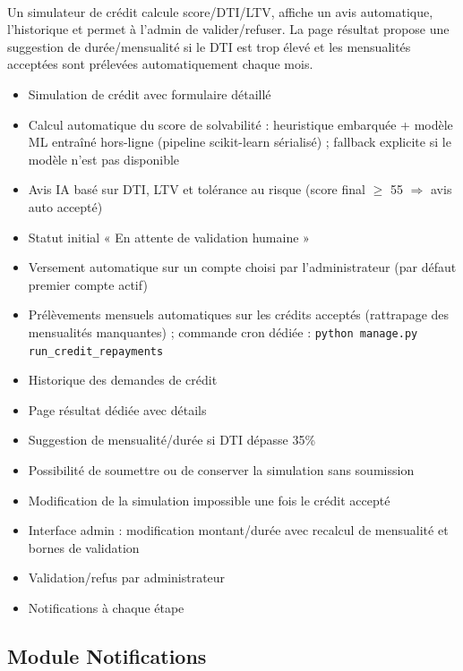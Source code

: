 \documentclass[12pt,a4paper]{report}
\begin{document}
\paragraph{}Un simulateur de crédit calcule score/DTI/LTV, affiche un avis automatique, l’historique et permet à l’admin de valider/refuser. La page résultat propose une suggestion de durée/mensualité si le DTI est trop élevé et les mensualités acceptées sont prélevées automatiquement chaque mois.
\begin{itemize}[leftmargin=1.5cm]
    \item Simulation de crédit avec formulaire détaillé
    \item Calcul automatique du score de solvabilité : heuristique embarquée + modèle ML entraîné hors-ligne (pipeline scikit-learn sérialisé) ; fallback explicite si le modèle n'est pas disponible
    \item Avis IA basé sur DTI, LTV et tolérance au risque (score final $\geq$ 55 $\Rightarrow$ avis auto accepté)
    \item Statut initial « En attente de validation humaine »
    \item Versement automatique sur un compte choisi par l'administrateur (par défaut premier compte actif)
    \item Prélèvements mensuels automatiques sur les crédits acceptés (rattrapage des mensualités manquantes) ; commande cron dédiée : \texttt{python manage.py run\_credit\_repayments}
    \item Historique des demandes de crédit
    \item Page résultat dédiée avec détails
    \item Suggestion de mensualité/durée si DTI dépasse 35\%
    \item Possibilité de soumettre ou de conserver la simulation sans soumission
    \item Modification de la simulation impossible une fois le crédit accepté
    \item Interface admin : modification montant/durée avec recalcul de mensualité et bornes de validation
    \item Validation/refus par administrateur
    \item Notifications à chaque étape
\end{itemize}

\subsection{Module Notifications}
\end{document}
